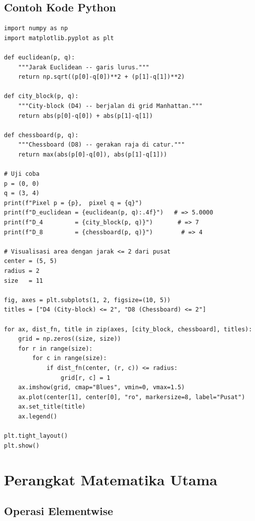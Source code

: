 \documentclass[12pt,a4paper]{article}
\begin{document}
\subsection{Contoh Kode Python}
 
\begin{lstlisting}[caption={Menghitung tiga jenis jarak antar pixel},
                   label={lst:distance}]
import numpy as np
import matplotlib.pyplot as plt
 
def euclidean(p, q):
    """Jarak Euclidean -- garis lurus."""
    return np.sqrt((p[0]-q[0])**2 + (p[1]-q[1])**2)
 
def city_block(p, q):
    """City-block (D4) -- berjalan di grid Manhattan."""
    return abs(p[0]-q[0]) + abs(p[1]-q[1])
 
def chessboard(p, q):
    """Chessboard (D8) -- gerakan raja di catur."""
    return max(abs(p[0]-q[0]), abs(p[1]-q[1]))
 
# Uji coba
p = (0, 0)
q = (3, 4)
print(f"Pixel p = {p},  pixel q = {q}")
print(f"D_euclidean = {euclidean(p, q):.4f}")   # => 5.0000
print(f"D_4         = {city_block(p, q)}")       # => 7
print(f"D_8         = {chessboard(p, q)}")        # => 4
 
# Visualisasi area dengan jarak <= 2 dari pusat
center = (5, 5)
radius = 2
size   = 11
 
fig, axes = plt.subplots(1, 2, figsize=(10, 5))
titles = ["D4 (City-block) <= 2", "D8 (Chessboard) <= 2"]
 
for ax, dist_fn, title in zip(axes, [city_block, chessboard], titles):
    grid = np.zeros((size, size))
    for r in range(size):
        for c in range(size):
            if dist_fn(center, (r, c)) <= radius:
                grid[r, c] = 1
    ax.imshow(grid, cmap="Blues", vmin=0, vmax=1.5)
    ax.plot(center[1], center[0], "ro", markersize=8, label="Pusat")
    ax.set_title(title)
    ax.legend()
 
plt.tight_layout()
plt.show()
\end{lstlisting}
 
\section{Perangkat Matematika Utama}
\label{sec:math}
 
\subsection{Operasi Elementwise}
 
\end{document}
